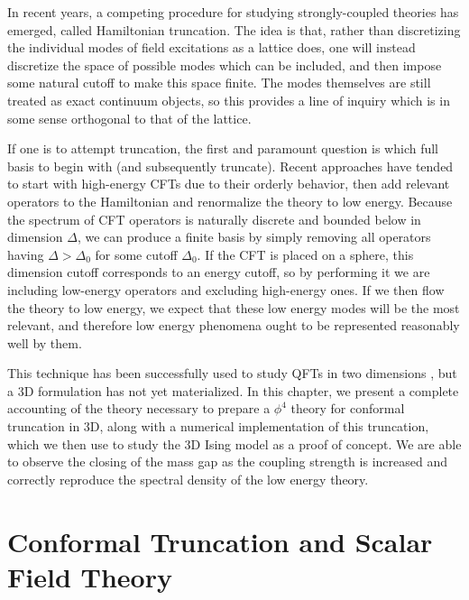 In recent years, a competing procedure for studying strongly-coupled theories
has emerged, called Hamiltonian truncation\cite{ref:truncation}. The idea is 
that, rather than discretizing the individual modes of field excitations as a
lattice does, one will instead discretize the space of possible modes which can
be included, and then impose some natural cutoff to make this space finite. The
modes themselves are still treated as exact continuum objects, so this provides
a line of inquiry which is in some sense orthogonal to that of the lattice. 

If one is to attempt truncation, the first and paramount question is which full
basis to begin with (and subsequently truncate). Recent approaches have tended
to start with high-energy CFTs due to their orderly behavior, then add relevant
operators to the Hamiltonian and renormalize the theory to low 
energy\cite{ref:zamotrunc}. Because the spectrum of CFT operators is naturally 
discrete and bounded below in dimension $\Delta$, we can produce a finite basis 
by simply removing all operators having $\Delta > \Delta_0$ for some cutoff 
$\Delta_0$. If the CFT is placed on a sphere, this dimension cutoff corresponds 
to an energy cutoff, so by performing it we are including low-energy operators 
and excluding high-energy ones. If we then flow the theory to low energy, we 
expect that these low energy modes will be the most relevant, and therefore low 
energy phenomena ought to be represented reasonably well by 
them\cite{ref:matt3d}.

This technique has been successfully used to study QFTs in two dimensions 
\cite{ref:2d}, but a 3D formulation has not yet materialized. In this chapter,
we present a complete accounting of the theory necessary to prepare a $\phi^4$
theory for conformal truncation in 3D, along with a numerical implementation of
this truncation, which we then use to study the 3D Ising model as a proof of 
concept. We are able to observe the closing of the mass gap as the coupling 
strength is increased and correctly reproduce the spectral density of the low
energy theory.




\section{Conformal Truncation and Scalar Field Theory}
\label{sec:Model}


